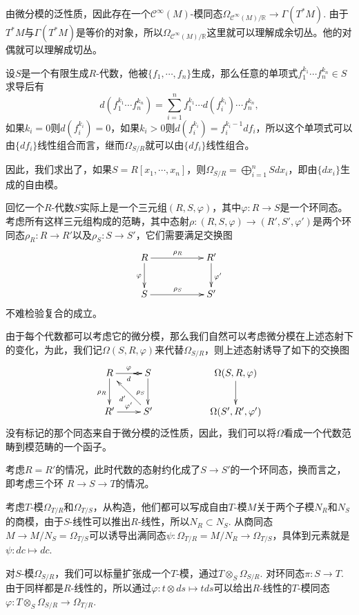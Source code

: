 由微分模的泛性质，因此存在一个$\mathcal{C}^\infty(M)$-模同态$\Omega_{\mathcal{C}^\infty(M)/\mathbb{R}}\to \Gamma(T^*M)$. 由于$T^*M$与$\Gamma(T^*M)$是等价的对象，所以$\Omega_{\mathcal{C}^\infty(M)/\mathbb{R}}$这里就可以理解成余切丛。他的对偶就可以理解成切丛。

\para 设$S$是一个有限生成$R$-代数，他被$\{f_1,\cdots,f_n\}$生成，那么任意的单项式$f_1^{k_1}\cdots f_n^{k_n}\in S$求导后有
\[
	d(f_1^{k_1}\cdots f_n^{k_n})=\sum_{i=1}^n f_1^{k_1}\cdots d(f_i^{k_i})\cdots f_n^{k_n},
\]
如果$k_i=0$则$d(f_i^{k_i})=0$，如果$k_i>0$则$d(f_i^{k_i})=f_i^{k_i-1}df_i$，所以这个单项式可以由$\{df_i\}$线性组合而言，继而$\Omega_{S/R}$就可以由$\{df_i\}$线性组合。

因此，我们求出了，如果$S=R[x_1,\cdots,x_n]$，则$\Omega_{S/R}=\bigoplus_{i=1}^n Sdx_i$，即由$\{dx_i\}$生成的自由模。

\para 回忆一个$R$-代数$S$实际上是一个三元组$(R,S,\varphi)$，其中$\varphi:R\to S$是一个环同态。考虑所有这样三元组构成的范畴，其中态射$\rho:(R,S,\varphi)\to (R',S',\varphi')$是两个环同态$\rho_R:R\to R'$以及$\rho_S:S\to S'$，它们需要满足交换图
\[
\begin{xy}
	\xymatrix
	{
		R\ar[rr]^{\rho_R} \ar[d]_{\varphi}&&R' \ar[d]^{\varphi'}\\
		S\ar[rr]^{\rho_S}&&S'
	}
\end{xy}
\]
不难检验复合的成立。

由于每个代数都可以考虑它的微分模，那么我们自然可以考虑微分模在上述态射下的变化，为此，我们记$\Omega(S,R,\varphi)$来代替$\Omega_{S/R}$，则上述态射诱导了如下的交换图
\[
\begin{xy}
	\xymatrix
	{
		R\ar[r]^{\varphi}\ar[d]_{\rho_R}&S\ar[rr]-^{d} \ar[d]_{\rho_S}&&\Omega(S,R,\varphi) \ar[d]\\
		R'\ar[r]^{\varphi'}&S'\ar[rr]-^{d'}&&\Omega(S',R',\varphi')
	}
\end{xy}
\]
没有标记的那个同态来自于微分模的泛性质，因此，我们可以将$\Omega$看成一个代数范畴到模范畴的一个函子。

\para 考虑$R=R'$的情况，此时代数的态射约化成了$S\to S'$的一个环同态，换而言之，即考虑三个环
$R\to S\to T$的情况。

考虑$T$-模$\Omega_{T/R}$和$\Omega_{T/S}$，从构造，他们都可以写成自由$T$-模$M$关于两个子模$N_R$和$N_S$的商模，由于$S$-线性可以推出$R$-线性，所以$N_R\subset N_S$. 从商同态$M\to M/N_S=\Omega_{T/S}$可以诱导出满同态$\psi:\Omega_{T/R}=M/N_R\to \Omega_{T/S}$，具体到元素就是$\psi:dc\mapsto dc$. 

对$S$-模$\Omega_{S/R}$，我们可以标量扩张成一个$T$-模，通过$T\otimes_S \Omega_{S/R}$. 对环同态$\pi:S\to T$. 由于同样都是$R$-线性的，所以通过$\varphi:t\otimes ds\mapsto tds$可以给出$R$-线性的$T$-模同态$\varphi:T\otimes_S \Omega_{S/R}\to \Omega_{T/R}$.

